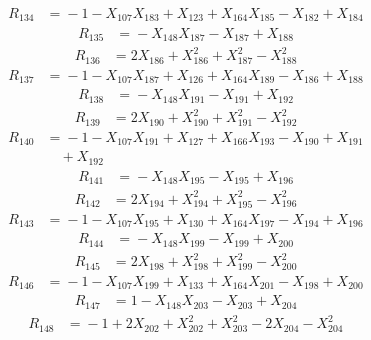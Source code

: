 \[\begin{aligned}
R_{134} &={}-1 - X_{107}X_{183} + X_{123} + X_{164}X_{185} - X_{182} + X_{184}
\end{aligned}\]
\[\begin{aligned}
R_{135} &={}-X_{148}X_{187} - X_{187} + X_{188}
\end{aligned}\]
\[\begin{aligned}
R_{136} &={}2X_{186} + X_{186}^{2} + X_{187}^{2} - X_{188}^{2}
\end{aligned}\]
\[\begin{aligned}
R_{137} &={}-1 - X_{107}X_{187} + X_{126} + X_{164}X_{189} - X_{186} + X_{188}
\end{aligned}\]
\[\begin{aligned}
R_{138} &={}-X_{148}X_{191} - X_{191} + X_{192}
\end{aligned}\]
\[\begin{aligned}
R_{139} &={}2X_{190} + X_{190}^{2} + X_{191}^{2} - X_{192}^{2}
\end{aligned}\]
\[\begin{aligned}
R_{140} &={}-1 - X_{107}X_{191} + X_{127} + X_{166}X_{193} - X_{190} + X_{191}\\
&\quad{} + X_{192}
\end{aligned}\]
\[\begin{aligned}
R_{141} &={}-X_{148}X_{195} - X_{195} + X_{196}
\end{aligned}\]
\[\begin{aligned}
R_{142} &={}2X_{194} + X_{194}^{2} + X_{195}^{2} - X_{196}^{2}
\end{aligned}\]
\[\begin{aligned}
R_{143} &={}-1 - X_{107}X_{195} + X_{130} + X_{164}X_{197} - X_{194} + X_{196}
\end{aligned}\]
\[\begin{aligned}
R_{144} &={}-X_{148}X_{199} - X_{199} + X_{200}
\end{aligned}\]
\[\begin{aligned}
R_{145} &={}2X_{198} + X_{198}^{2} + X_{199}^{2} - X_{200}^{2}
\end{aligned}\]
\[\begin{aligned}
R_{146} &={}-1 - X_{107}X_{199} + X_{133} + X_{164}X_{201} - X_{198} + X_{200}
\end{aligned}\]
\[\begin{aligned}
R_{147} &={}1 - X_{148}X_{203} - X_{203} + X_{204}
\end{aligned}\]
\[\begin{aligned}
R_{148} &={}-1 + 2X_{202} + X_{202}^{2} + X_{203}^{2} - 2X_{204} - X_{204}^{2}
\end{aligned}\]
